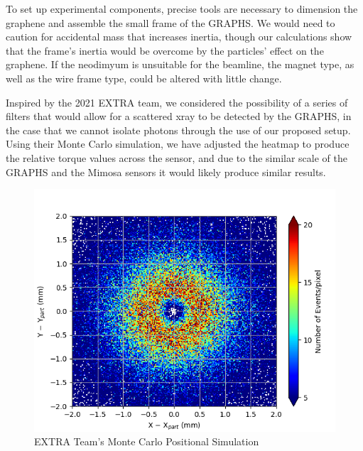 \documentclass{article}
\begin{document}
To set up experimental components, precise tools are necessary to dimension the graphene and assemble the small frame of the GRAPHS. We would need to caution for accidental mass that increases inertia, though our calculations show that the frame's inertia would be overcome by the particles' effect on the graphene. If the neodimyum is unsuitable for the beamline, the magnet type, as well as the wire frame type, could be altered with little change.

Inspired by the 2021 EXTRA team\cite{EXTRA}, we considered the possibility of a series of filters that would allow for a scattered xray to be detected by the GRAPHS, in the case that we cannot isolate photons through the use of our proposed setup. Using their Monte Carlo simulation, we have adjusted the heatmap to produce the relative torque values across the sensor, and due to the similar scale of the GRAPHS and the Mimosa sensors it would likely produce similar results.

\begin{figure}[H]
\includegraphics[scale=0.5]{extra.png}
\caption{EXTRA Team's Monte Carlo Positional Simulation}
\end{figure}
\end{document}
